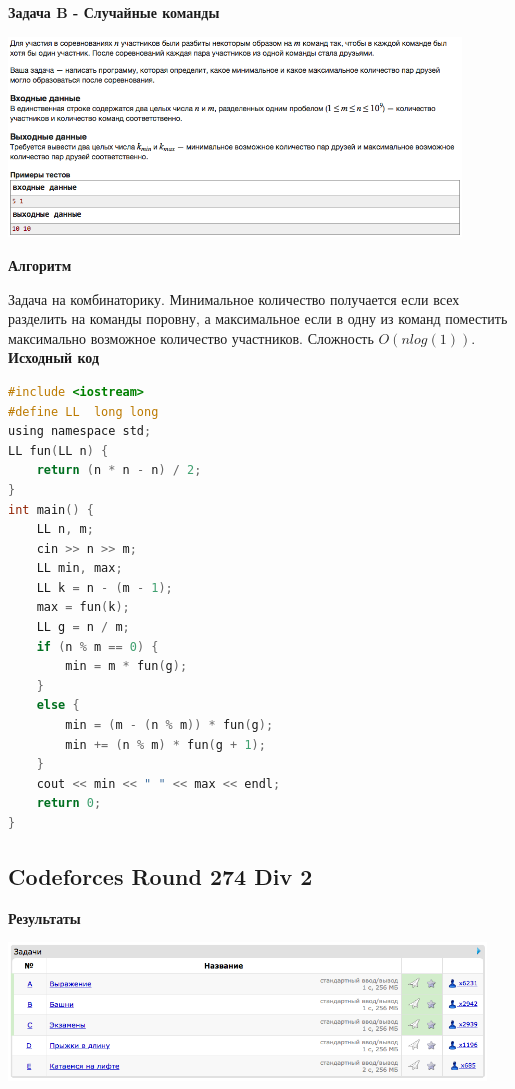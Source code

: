 \documentclass[a4paper,12pt]{article}
\begin{document}
\newpage
\textbf{{\large Задача B - Случайные команды}}

\begin{center}
\includegraphics[width=0.9\textwidth]{C_273/C_273_B.png}\\ [1cm]
\end{center}

\textbf{{\large Алгоритм}}

Задача на комбинаторику. Минимальное количество получается если всех разделить на команды поровну, а максимальное если в одну из команд поместить максимально возможное количество участников. Сложность $O(nlog(1))$.\\

\textbf{{\large Исходный код}} \\
\begin{lstlisting}[language=C]
#include <iostream>
#define LL  long long
using namespace std;
LL fun(LL n) {
    return (n * n - n) / 2;
}
int main() {
    LL n, m;
    cin >> n >> m;
    LL min, max;
    LL k = n - (m - 1);
    max = fun(k);
    LL g = n / m;
    if (n % m == 0) {
        min = m * fun(g);
    }
    else {
        min = (m - (n % m)) * fun(g);
        min += (n % m) * fun(g + 1);
    }
    cout << min << " " << max << endl;
    return 0;
}
\end{lstlisting}



%
%

\newpage
\subsection{Codeforces Round 274 Div 2}

\textbf{{\large Результаты}} \\
\begin{center}
\includegraphics[width=0.95\textwidth]{C_274/C_274_result.png}\\ [1cm]
\end{center}
\end{document}

